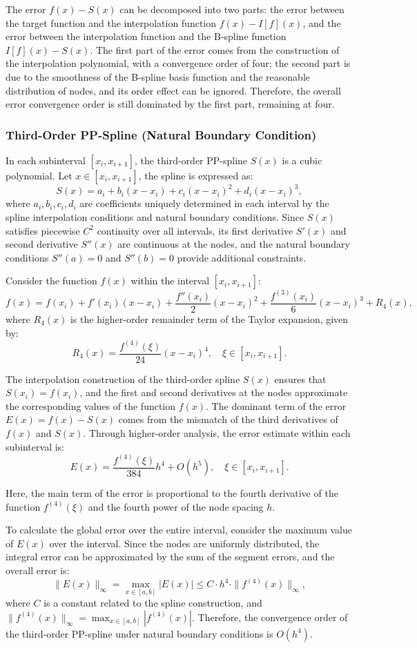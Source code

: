 \documentclass[a4paper]{article}
\begin{document}
The error \(f(x) - S(x)\) can be decomposed into two parts: the error between the target function and the interpolation function \(f(x) - I[f](x)\), and the error between the interpolation function and the B-spline function \(I[f](x) - S(x)\). The first part of the error comes from the construction of the interpolation polynomial, with a convergence order of four; the second part is due to the smoothness of the B-spline basis function and the reasonable distribution of nodes, and its order effect can be ignored. Therefore, the overall error convergence order is still dominated by the first part, remaining at four.

\subsubsection{Third-Order PP-Spline (Natural Boundary Condition)}

In each subinterval \([x_i, x_{i+1}]\), the third-order PP-spline \(S(x)\) is a cubic polynomial. Let \(x \in [x_i, x_{i+1}]\), the spline is expressed as:
\[
S(x) = a_i + b_i(x-x_i) + c_i(x-x_i)^2 + d_i(x-x_i)^3,
\]
where \(a_i, b_i, c_i, d_i\) are coefficients uniquely determined in each interval by the spline interpolation conditions and natural boundary conditions. Since \(S(x)\) satisfies piecewise \(C^2\) continuity over all intervals, its first derivative \(S'(x)\) and second derivative \(S''(x)\) are continuous at the nodes, and the natural boundary conditions \(S''(a) = 0\) and \(S''(b) = 0\) provide additional constraints.

Consider the function \(f(x)\) within the interval \([x_i, x_{i+1}]\):
\[
f(x) = f(x_i) + f'(x_i)(x-x_i) + \frac{f''(x_i)}{2}(x-x_i)^2 + \frac{f^{(3)}(x_i)}{6}(x-x_i)^3 + R_4(x),
\]
where \(R_4(x)\) is the higher-order remainder term of the Taylor expansion, given by:
\[
R_4(x) = \frac{f^{(4)}(\xi)}{24}(x-x_i)^4, \quad \xi \in [x_i, x_{i+1}].
\]

The interpolation construction of the third-order spline \(S(x)\) ensures that \(S(x_i) = f(x_i)\), and the first and second derivatives at the nodes approximate the corresponding values of the function \(f(x)\). The dominant term of the error \(E(x) = f(x) - S(x)\) comes from the mismatch of the third derivatives of \(f(x)\) and \(S(x)\). Through higher-order analysis, the error estimate within each subinterval is:
\[
E(x) = \frac{f^{(4)}(\xi)}{384}h^4 + O(h^5), \quad \xi \in [x_i, x_{i+1}].
\]

Here, the main term of the error is proportional to the fourth derivative of the function \(f^{(4)}(\xi)\) and the fourth power of the node spacing \(h\).

To calculate the global error over the entire interval, consider the maximum value of \(E(x)\) over the interval. Since the nodes are uniformly distributed, the integral error can be approximated by the sum of the segment errors, and the overall error is:
\[
\|E(x)\|_\infty = \max_{x \in [a, b]} |E(x)| \leq C \cdot h^4 \cdot \|f^{(4)}(x)\|_\infty,
\]
where \(C\) is a constant related to the spline construction, and \(\|f^{(4)}(x)\|_\infty = \max_{x \in [a, b]} |f^{(4)}(x)|\). Therefore, the convergence order of the third-order PP-spline under natural boundary conditions is \(O(h^4)\).
\end{document}
